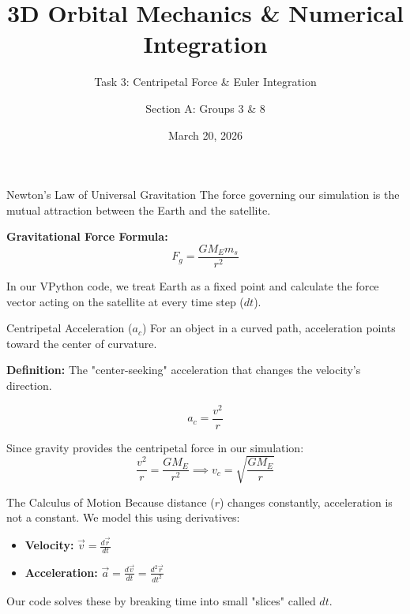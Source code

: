 \documentclass{beamer}
\title[Orbital Mechanics Project]{3D Orbital Mechanics \& Numerical Integration}
\subtitle{Task 3: Centripetal Force \& Euler Integration}
\author[Groups 3 \& 8]{Section A: Groups 3 \& 8}
\institute[St. John Baptist De La Salle]{St. John Baptist De La Salle Catholic School}
\date{March 20, 2026}
\begin{document}
\begin{frame}
    \titlepage
\end{frame}

\begin{frame}{Newton's Law of Universal Gravitation}
    The force governing our simulation is the mutual attraction between the Earth and the satellite.
    
    \vspace{0.4cm}
    \textbf{Gravitational Force Formula:}
    \begin{equation}
        F_g = \frac{G M_E m_s}{r^2}
    \end{equation}
    
    \vspace{0.4cm}
    In our VPython code, we treat Earth as a fixed point and calculate the force vector acting on the satellite at every time step ($dt$).
\end{frame}

\begin{frame}{Centripetal Acceleration ($a_c$)}
    For an object in a curved path, acceleration points toward the center of curvature.
    
    \vspace{0.4cm}
    \textbf{Definition:} The "center-seeking" acceleration that changes the velocity's direction.
    
    \begin{equation}
        a_c = \frac{v^2}{r}
    \end{equation}
    
    Since gravity provides the centripetal force in our simulation:
    \begin{equation}
        \frac{v^2}{r} = \frac{G M_E}{r^2} \implies v_c = \sqrt{\frac{G M_E}{r}}
    \end{equation}
\end{frame}

\begin{frame}{The Calculus of Motion}
    Because distance ($r$) changes constantly, acceleration is not a constant. We model this using derivatives:
    
    \vspace{0.5cm}
    \begin{itemize}
        \item \textbf{Velocity:} $\vec{v} = \frac{d\vec{r}}{dt}$
        \vspace{0.3cm}
        \item \textbf{Acceleration:} $\vec{a} = \frac{d\vec{v}}{dt} = \frac{d^2\vec{r}}{dt^2}$
    \end{itemize}
    
    \vspace{0.5cm}
    Our code solves these by breaking time into small "slices" called $dt$.
\end{frame}
\end{document}
